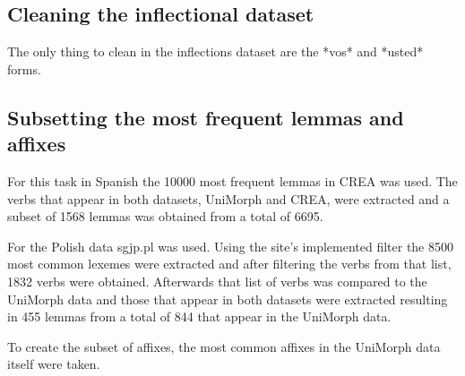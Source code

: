 \documentclass[12pt]{article}
\begin{document}
\subsection{Cleaning the inflectional dataset}

The only thing to clean in the inflections dataset are the *vos* and *usted* forms.

\subsection{Subsetting the most frequent lemmas and affixes}

For this task in Spanish the 10000 most frequent lemmas in CREA was used. The verbs that appear in both datasets, UniMorph and CREA, were extracted and a subset of 1568 lemmas was obtained from a total of 6695. 

For the Polish data sgjp.pl was used. Using the site's implemented filter the 8500 most common lexemes were extracted and after filtering the verbs from that list, 1832 verbs were obtained. Afterwards that list of verbs was compared to the UniMorph data and  those that appear in both datasets were extracted resulting in 455 lemmas from a total of 844 that appear in the UniMorph data.

To create the subset of affixes, the most common affixes in the UniMorph data itself were taken.
\end{document}
